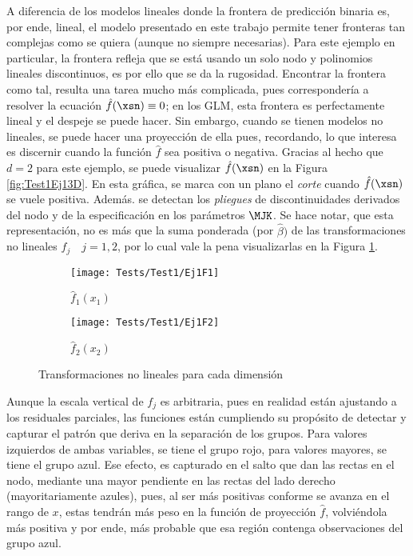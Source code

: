 A diferencia de los modelos lineales donde la frontera de predicción binaria es, por ende, lineal, el modelo presentado en este trabajo permite tener fronteras tan complejas como se quiera (aunque no siempre necesarias). Para este ejemplo en particular, la frontera refleja que se está usando un solo nodo y polinomios lineales discontinuos, es por ello que se da la rugosidad. Encontrar la frontera como tal, resulta una tarea mucho más complicada, pues correspondería a resolver la ecuación  $\hat{f}(\xsn) \equiv 0$; en los GLM, esta frontera es perfectamente lineal y el despeje se puede hacer. Sin embargo, cuando se tienen modelos no lineales, se puede hacer una proyección de ella pues, recordando, lo que interesa es discernir cuando la función $\hat{f}$ sea positiva o negativa. Gracias al hecho que $d = 2$ para este ejemplo, se puede visualizar $\hat{f}(\xsn)$ en la Figura \ref{fig:Test1Ej13D}. En esta gráfica, se marca con un plano el \textit{corte} cuando $\hat{f}(\xsn)$ se vuele positiva. Además. se detectan los \textit{pliegues} de discontinuidades derivados del nodo y de la especificación en los parámetros $\MJK$. Se hace notar, que esta representación, no es más que la suma ponderada (por $\hat{\beta})$ de las transformaciones no lineales $f_j \quad j=1,2$, por lo cual vale la pena visualizarlas en la Figura \ref{fig:Test1Ej1Fs}. 
\begin{figure}[h]
    \begin{subfigure}[b]{0.45\textwidth}
        \texttt{[image: Tests/Test1/Ej1F1]}
        \caption{$\hat{f}_1(x_1)$}
    \end{subfigure}
	\hfill
	    \begin{subfigure}[b]{0.45\textwidth}
        \texttt{[image: Tests/Test1/Ej1F2]}
        \caption{$\hat{f}_2(x_2)$}
    \end{subfigure}
    \caption{Transformaciones no lineales para cada dimensión}\label{fig:Test1Ej1Fs}
\end{figure}
Aunque la escala vertical de $f_j$ es arbitraria, pues en realidad  están ajustando a los residuales parciales, las funciones están cumpliendo su propósito de detectar y capturar el patrón que deriva en la separación de los grupos. Para valores izquierdos de ambas variables, se tiene el grupo rojo, para valores mayores, se tiene el grupo azul. Ese efecto, es capturado en el salto que dan las rectas en el nodo, mediante una mayor pendiente en las rectas del lado derecho (mayoritariamente azules), pues, al ser más positivas conforme se avanza en el rango de $x$, estas tendrán más peso en la función de proyección $\hat{f}$, volviéndola más positiva y por ende, más probable que esa región contenga observaciones del grupo azul.

